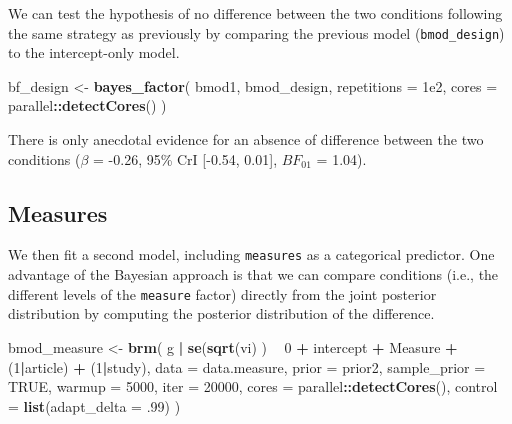 \documentclass[floatsintext,doc]{apa6}
\newenvironment{Shaded}{\begin{snugshade}}{\end{snugshade}}
\newcommand{\DataTypeTok}[1]{\textcolor[rgb]{0.13,0.29,0.53}{#1}}
\newcommand{\DecValTok}[1]{\textcolor[rgb]{0.00,0.00,0.81}{#1}}
\newcommand{\FloatTok}[1]{\textcolor[rgb]{0.00,0.00,0.81}{#1}}
\newcommand{\KeywordTok}[1]{\textcolor[rgb]{0.13,0.29,0.53}{\textbf{#1}}}
\newcommand{\NormalTok}[1]{#1}
\newcommand{\OperatorTok}[1]{\textcolor[rgb]{0.81,0.36,0.00}{\textbf{#1}}}
\newcommand{\OtherTok}[1]{\textcolor[rgb]{0.56,0.35,0.01}{#1}}
\newcommand{\StringTok}[1]{\textcolor[rgb]{0.31,0.60,0.02}{#1}}
\begin{document}
We can test the hypothesis of no difference between the two conditions following the same strategy as previously by comparing the previous model (\texttt{bmod\_design}) to the intercept-only model.

\begin{Shaded}
\begin{Highlighting}[]
\NormalTok{bf_design <-}\StringTok{ }\KeywordTok{bayes_factor}\NormalTok{(}
\NormalTok{    bmod1, bmod_design,}
    \DataTypeTok{repetitions =} \FloatTok{1e2}\NormalTok{, }\DataTypeTok{cores =}\NormalTok{ parallel}\OperatorTok{::}\KeywordTok{detectCores}\NormalTok{()}
\NormalTok{    )}
\end{Highlighting}
\end{Shaded}

There is only anecdotal evidence for an absence of difference between the two conditions (\(\beta\) = -0.26, 95\% CrI {[}-0.54, 0.01{]}, \(BF_{01}\) = 1.04).

\hypertarget{measures}{%
\subsection{Measures}\label{measures}}

We then fit a second model, including \texttt{measures} as a categorical predictor. One advantage of the Bayesian approach is that we can compare conditions (i.e., the different levels of the \texttt{measure} factor) directly from the joint posterior distribution by computing the posterior distribution of the difference.

\begin{Shaded}
\begin{Highlighting}[]
\NormalTok{bmod_measure <-}\StringTok{ }\KeywordTok{brm}\NormalTok{(}
\NormalTok{    g }\OperatorTok{|}\StringTok{ }\KeywordTok{se}\NormalTok{(}\KeywordTok{sqrt}\NormalTok{(vi) ) }\OperatorTok{~}\StringTok{ }\DecValTok{0} \OperatorTok{+}\StringTok{ }\NormalTok{intercept }\OperatorTok{+}\StringTok{ }\NormalTok{Measure }\OperatorTok{+}\StringTok{ }\NormalTok{(}\DecValTok{1}\OperatorTok{|}\NormalTok{article) }\OperatorTok{+}\StringTok{ }\NormalTok{(}\DecValTok{1}\OperatorTok{|}\NormalTok{study),}
    \DataTypeTok{data =}\NormalTok{ data.measure,}
    \DataTypeTok{prior =}\NormalTok{ prior2,}
    \DataTypeTok{sample_prior =} \OtherTok{TRUE}\NormalTok{,}
    \DataTypeTok{warmup =} \DecValTok{5000}\NormalTok{,}
    \DataTypeTok{iter =} \DecValTok{20000}\NormalTok{,}
    \DataTypeTok{cores =}\NormalTok{ parallel}\OperatorTok{::}\KeywordTok{detectCores}\NormalTok{(),}
    \DataTypeTok{control =} \KeywordTok{list}\NormalTok{(}\DataTypeTok{adapt_delta =} \FloatTok{.99}\NormalTok{)}
\NormalTok{    )}
\end{Highlighting}
\end{Shaded}
\end{document}
